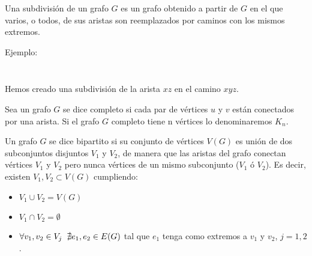 \documentclass[12pt,a4paper,oldfontcommands]{memoir}
\begin{document}
\begin{definition}
	Una subdivisión de un grafo $G$ es un grafo obtenido a partir de $G$ en el que varios, o todos, de sus aristas son reemplazados por caminos con los mismos extremos.
\end{definition}

Ejemplo:

\[\]
\[\]

Hemos creado una subdivisión de la arista $xz$ en el camino $xyz$.
	
\begin{definition}
	Sea un grafo $G$ se dice completo si cada par de vértices $u$ y $v$ están conectados por una arista. Si el grafo $G$ completo tiene n vértices lo denominaremos $K_n$.
\end{definition}

\begin{definition}
	Un grafo $G$ se dice bipartito si su conjunto de vértices $V(G)$ es unión de dos subconjuntos disjuntos $V_1$ y $V_2$, de manera que las aristas del grafo conectan vértices $V_1$ y $V_2$ pero nunca    vértices de un mismo subconjunto ($V_1$ ó $V_2$). Es decir, existen $V_1,V_2 \subset V(G)$ cumpliendo:
	\begin{itemize}
		\item $V_1 \cup V_2 = V(G)$
		\item $V_1 \cap V_2 = \emptyset$
		\item $\forall v_{1},v_{2} \in V_j \hspace{0.1cm}  \hspace{0.1cm} \nexists e_{1},e_{2} \in E(G)$ tal que $e_{1}$ tenga como extremos a $v_{1}$ y $v_{2}$, $j=1,2$.
	\end{itemize}
\end{definition}
\end{document}
